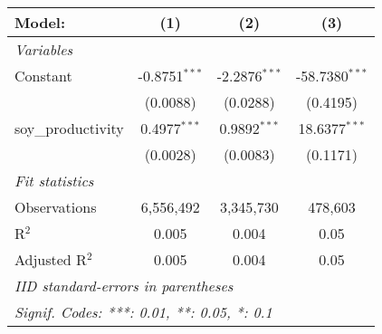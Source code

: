 
\begingroup
\centering
\begin{adjustbox}{width = \textwidth, center}
   \begin{tabular}{lccc}
      \tabularnewline \midrule \midrule
      Model:             & (1)             & (2)             & (3)\\  
      \midrule
      \emph{Variables}\\
      Constant           & -0.8751$^{***}$ & -2.2876$^{***}$ & -58.7380$^{***}$\\   
                         & (0.0088)        & (0.0288)        & (0.4195)\\   
      soy\_productivity  & 0.4977$^{***}$  & 0.9892$^{***}$  & 18.6377$^{***}$\\   
                         & (0.0028)        & (0.0083)        & (0.1171)\\   
      \midrule
      \emph{Fit statistics}\\
      Observations       & 6,556,492       & 3,345,730       & 478,603\\  
      R$^2$              & 0.005           & 0.004           & 0.05\\  
      Adjusted R$^2$     & 0.005           & 0.004           & 0.05\\  
      \midrule \midrule
      \multicolumn{4}{l}{\emph{IID standard-errors in parentheses}}\\
      \multicolumn{4}{l}{\emph{Signif. Codes: ***: 0.01, **: 0.05, *: 0.1}}\\
   \end{tabular}
\end{adjustbox}
\par\endgroup


